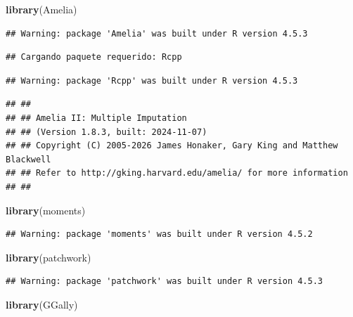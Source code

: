 \documentclass[
]{book}
\newenvironment{Shaded}{\begin{snugshade}}{\end{snugshade}}
\newcommand{\FunctionTok}[1]{\textcolor[rgb]{0.13,0.29,0.53}{\textbf{#1}}}
\newcommand{\NormalTok}[1]{#1}
\begin{document}
\begin{Shaded}
\begin{Highlighting}[]
\FunctionTok{library}\NormalTok{(Amelia)}
\end{Highlighting}
\end{Shaded}

\begin{verbatim}
## Warning: package 'Amelia' was built under R version 4.5.3
\end{verbatim}

\begin{verbatim}
## Cargando paquete requerido: Rcpp
\end{verbatim}

\begin{verbatim}
## Warning: package 'Rcpp' was built under R version 4.5.3
\end{verbatim}

\begin{verbatim}
## ## 
## ## Amelia II: Multiple Imputation
## ## (Version 1.8.3, built: 2024-11-07)
## ## Copyright (C) 2005-2026 James Honaker, Gary King and Matthew Blackwell
## ## Refer to http://gking.harvard.edu/amelia/ for more information
## ##
\end{verbatim}

\begin{Shaded}
\begin{Highlighting}[]
\FunctionTok{library}\NormalTok{(moments)}
\end{Highlighting}
\end{Shaded}

\begin{verbatim}
## Warning: package 'moments' was built under R version 4.5.2
\end{verbatim}

\begin{Shaded}
\begin{Highlighting}[]
\FunctionTok{library}\NormalTok{(patchwork) }
\end{Highlighting}
\end{Shaded}

\begin{verbatim}
## Warning: package 'patchwork' was built under R version 4.5.3
\end{verbatim}

\begin{Shaded}
\begin{Highlighting}[]
\FunctionTok{library}\NormalTok{(GGally)}
\end{Highlighting}
\end{Shaded}
\end{document}
